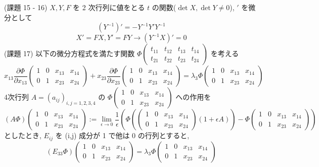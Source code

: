 \documentclass{article}
\begin{document}
(課題 15 - 16) $X, Y, F$ を 2 次行列に値をとる $t$ の関数($\det X, \det Y \ne 0$), $'$ を微分として
\[ (Y^{-1})'= -Y^{-1}Y'Y^{-1} \]
\[ X'=FX, Y'=FY \to (Y^{-1}X)' = 0\] 
(課題 17) 以下の微分方程式を満たす関数 $\Phi\begin{pmatrix}
t_{11} & t_{12} & t_{13} & t_{14} \\
t_{21} & t_{22} & t_{23} & t_{24}
\end{pmatrix}$ を考える
\[ x_{13} \frac{\partial \Phi}{\partial x_{13}} \begin{pmatrix}
  1 & 0 & x_{13} & x_{14} \\
  0 & 1 & x_{23} & x_{24}
\end{pmatrix} + x_{23} \frac{\partial \Phi}{\partial x_{23}} \begin{pmatrix}
  1 & 0 & x_{13} & x_{14} \\
  0 & 1 & x_{23} & x_{24}
\end{pmatrix}= \lambda_3 \Phi \begin{pmatrix}
  1 & 0 & x_{13} & x_{14} \\
  0 & 1 & x_{23} & x_{24}
\end{pmatrix}\]
4次行列 $A = (a_{ij})_{i,j = 1,2,3,4}$ の $\Phi\begin{pmatrix}
  1 & 0 & x_{13} & x_{14} \\
  0 & 1 & x_{23} & x_{24}
\end{pmatrix}$ への作用を
\[ (A\Phi) \begin{pmatrix}
  1 & 0 & x_{13} & x_{14} \\
  0 & 1 & x_{23} & x_{24}
\end{pmatrix} := \lim_{\epsilon \to 0} \frac{1}{\epsilon} \left( \Phi \left( \begin{pmatrix}
  1 & 0 & x_{13} & x_{14} \\
  0 & 1 & x_{23} & x_{24} 
\end{pmatrix} (1 + \epsilon A) \right) - \Phi \begin{pmatrix}
  1 & 0 & x_{13} & x_{14} \\
  0 & 1 & x_{23} & x_{24} 
\end{pmatrix} \right) \]
としたとき,
$E_{ij}$ を (i,j) 成分が 1 で他は 0 の行列とすると,
\[ (E_{33} \Phi) \begin{pmatrix}
  1 & 0 & x_{13} & x_{14} \\
  0 & 1 & x_{23} & x_{24}
\end{pmatrix} = \lambda_3 \Phi \begin{pmatrix}
  1 & 0 & x_{13} & x_{14} \\
  0 & 1 & x_{23} & x_{24}
\end{pmatrix} \]
\end{document}

